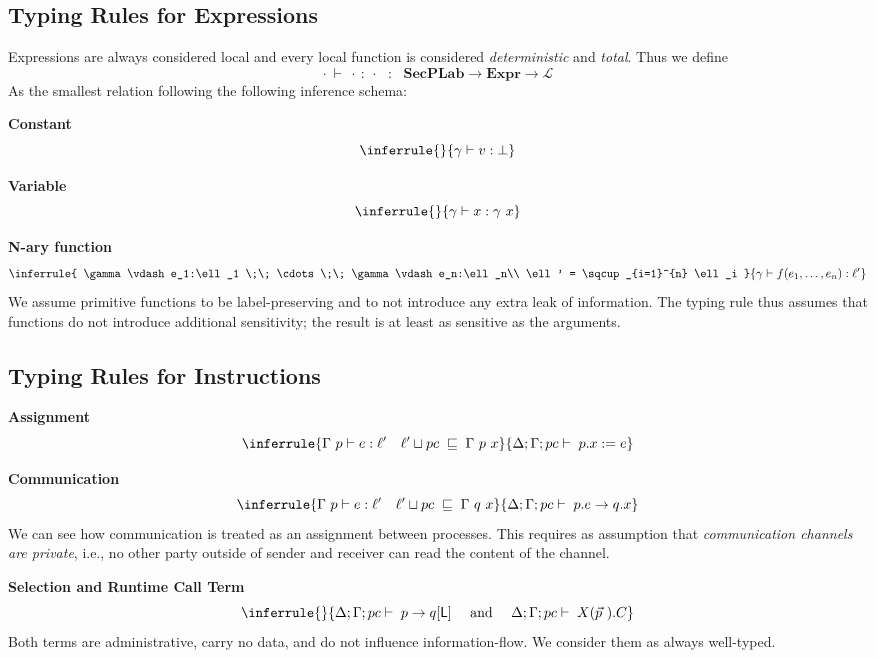 \documentclass[12pt,a4paper,twoside]{book}
\newcommand{\MCL}{\mathscr{L}}
\begin{document}
\subsection{Typing Rules for Expressions}\label{typ_def:expr}
Expressions are always considered local and every local function is considered \textit{deterministic} and \textit{total}. Thus we define
$$ \cdot ~\vdash~ \cdot~:~\cdot ~~~:~~~ \textbf{SecPLab} \rightarrow \textbf{Expr} \rightarrow \MCL $$
As the smallest relation following the following inference schema:

\medskip
\noindent\textbf{Constant}
\[
  \inferrule{}
  {\gamma \vdash v : \bot}
\]

\medskip
\noindent\textbf{Variable}
\[
  \inferrule{}
  {\gamma \vdash x : \gamma~x}
\]

\medskip
\noindent\textbf{N-ary function}
\[
\inferrule{
  \gamma\vdash e_1:\ell_1 \;\; \cdots \;\; \gamma\vdash e_n:\ell_n\\
  \ell' = \sqcup_{i=1}^{n} \ell_i
}{
  \gamma\vdash f(e_1,\dots,e_n):\ell'
}
\]
We assume primitive functions to be label-preserving and to not introduce any extra leak of information.
The typing rule thus assumes that functions do not introduce additional sensitivity; the result is at least as sensitive as the arguments.

\subsection{Typing Rules for Instructions}
\medskip
\noindent\textbf{Assignment}
\[
  \inferrule
  {\Gamma~p \vdash e : \ell' \quad \ell' \sqcup pc \;\sqsubseteq\; \Gamma~p~x}
  {\Delta;\Gamma;pc \vdash \; p.x := e}
\]

\medskip
\noindent\textbf{Communication}
\[
  \inferrule
  {\Gamma~p \vdash e : \ell' \quad \ell' \sqcup pc \;\sqsubseteq\; \Gamma~q~x}
  {\Delta;\Gamma;pc \vdash \; p.e \to q.x}
\]
We can see how communication is treated as an assignment between processes. This requires as assumption that \textit{communication channels are private}, i.e., no other party outside of sender and receiver can read the content of the channel.

\medskip
\noindent\textbf{Selection and Runtime Call Term}
\[
	\inferrule{}{
	\Delta;\Gamma;pc \vdash \; p \to q[\mathsf{L}]
    \quad\text{ and }\quad
    \Delta;\Gamma;pc \vdash \; X(\vec{p}~).C
  }
\]
Both terms are administrative, carry no data, and do not influence information-flow. We consider them as always well-typed.
\end{document}
